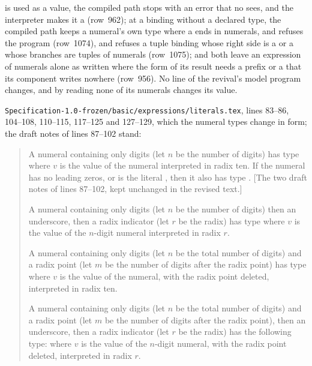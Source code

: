 \begin{description}
is used as a value, the compiled path stops with an error that no 
sees, and the interpreter makes it a  (row~962); at a binding
without a declared type, the compiled path keeps a numeral's own type where a
 ends in numerals, and refuses the program (row~1074), and refuses a
tuple binding whose right side is a  or a  whose branches are
tuples of numerals (row~1075); and both leave an expression of numerals alone
as written where the form of its result needs a prefix \EXP{-} or a \EXP{/}
that its component writes nowhere (row~956).
No line of the revival's model program changes, and by reading none of its
numerals changes its value.
\item[Original text] \nolinkurl{Specification-1.0-frozen/basic/expressions/literals.tex},
lines 83--86, 104--108, 110--115, 117--125 and 127--129, which the numeral types
change in form; the draft notes of lines 87--102 stand:
\begin{quote}
A numeral containing only digits (let $n$ be the number of digits)
has type  where $v$ is the value of the numeral
interpreted in radix ten.  If the numeral has no leading zeros, or is
the literal , then it also has type .
[The two draft notes of lines 87--102, kept unchanged in the revised text.]

A numeral containing only digits (let $n$ be the number of
digits) then an underscore, then a radix indicator (let $r$ be the
radix) has type 
where $v$ is
the value of the $n$-digit numeral interpreted in radix $r$.

A numeral containing only digits (let $n$ be the total number
of digits) and a radix point (let $m$ be the number of digits after
the radix point) has type
 where $v$ is
the value of the numeral, with the radix point deleted,
interpreted in radix ten.

A numeral containing only digits (let $n$ be the total number
of digits) and a radix point (let $m$ be the number of digits after
the radix point), then an underscore, then a radix indicator (let $r$
be the radix) has the following type:
where $v$ is the value of the $n$-digit numeral, with the radix point
deleted, interpreted in radix $r$.


\end{quote}
\end{description}

